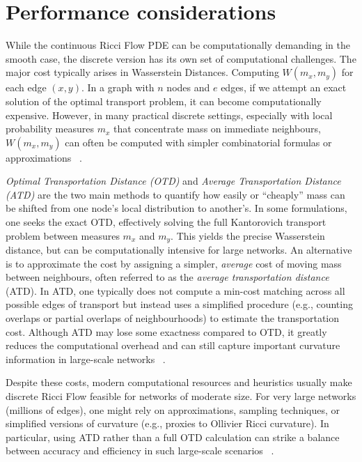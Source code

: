 
\section{Performance considerations}
\label{sec:ricci_flow_networks_performance}

While the continuous Ricci Flow PDE can be computationally demanding in the smooth case, the discrete version has its own set of computational challenges. The major cost typically arises in Wasserstein Distances. Computing $W(m_x, m_y)$ for each edge $(x,y)$. In a graph with $n$ nodes and $e$ edges, if we attempt an exact solution of the optimal transport problem, it can become computationally expensive. However, in many practical discrete settings, especially with local probability measures $m_x$ that concentrate mass on immediate neighbours, $W(m_x,m_y)$ can often be computed with simpler combinatorial formulas or approximations ~\cite{Ni:communitydetectionnetworksricci}. 

\emph{Optimal Transportation Distance (OTD)} and  \emph{Average Transportation Distance (ATD)} are the two main methods to quantify how easily or “cheaply” mass can be shifted from one node’s local distribution to another’s.
In some formulations, one seeks the exact OTD, effectively solving the full Kantorovich transport problem between measures $m_x$ and $m_y$. This yields the precise Wasserstein distance, but can be computationally intensive for large networks. An alternative is to approximate the cost by assigning a simpler, \emph{average} cost of moving mass between neighbours, often referred to as the \emph{average transportation distance} (ATD). In ATD, one typically does not compute a min-cost matching across all possible edges of transport but instead uses a simplified procedure (e.g., counting overlaps or partial overlaps of neighbourhoods) to estimate the transportation cost. Although ATD may lose some exactness compared to OTD, it greatly reduces the computational overhead and can still capture important curvature information in large-scale networks ~\cite{ni2018networkalignmentdiscreteollivierricci}.

Despite these costs, modern computational resources and heuristics usually make discrete Ricci Flow feasible for networks of moderate size. For very large networks (millions of edges), one might rely on approximations, sampling techniques, or simplified versions of curvature (e.g., proxies to Ollivier Ricci curvature). In particular, using ATD rather than a full OTD calculation can strike a balance between accuracy and efficiency in such large-scale scenarios ~\cite{ni2018networkalignmentdiscreteollivierricci}.



